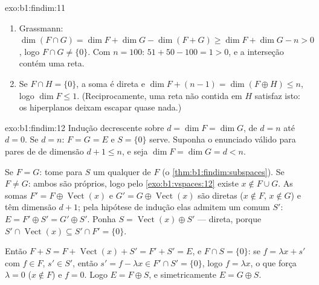 \begin{solution}{exo:b1:findim:11}
\begin{enumerate}
  \item Grassmann: $\dim(F \cap G) = \dim F + \dim G - \dim(F +
        G) \geq \dim F + \dim G - n > 0$, logo $F \cap G \neq
        \{0\}$. Com $n = 100$: $51 + 50 - 100 = 1 > 0$, e a
        interseção contém uma reta.
  \item Se $F \cap H = \{0\}$, a soma é direta e $\dim F +
        (n - 1) = \dim(F \oplus H) \leq n$, logo $\dim F \leq 1$.
        (Reciprocamente, uma reta não contida em $H$ satisfaz
        isto: os hiperplanos deixam escapar quase nada.)
\end{enumerate}
\end{solution}

\begin{solution}{exo:b1:findim:12}
Indução decrescente sobre $d = \dim F = \dim G$, de $d = n$ até $d = 0$. Se
$d = n$: $F = G = E$ e $S = \{0\}$ serve. Suponha o enunciado válido para
pares de  de dimensão $d + 1 \leq n$, e seja $\dim F = \dim G = d < n$.

Se $F = G$: tome para $S$ um  qualquer de $F$
(o \cref{thm:b1:findim:subspaces}). Se $F \neq G$: ambos são próprios, logo pelo \cref{exo:b1:vspaces:12} existe
$x \notin F \cup G$. As somas $F' = F \oplus \operatorname{Vect}(x)$ e $G' = G \oplus
\operatorname{Vect}(x)$ são diretas ($x \notin F$, $x \notin G$) e têm
dimensão $d + 1$; pela hipótese de indução elas admitem um
 comum $S'$: $E = F' \oplus S' = G' \oplus
S'$. Ponha $S = \operatorname{Vect}(x) \oplus S'$ --- direta, porque
$S' \cap \operatorname{Vect}(x) \subseteq S' \cap F' =
\{0\}$.

Então $F + S = F + \operatorname{Vect}(x) + S' = F' + S' = E$, e $F \cap S = \{0\}$: se $f = \lambda x + s'$ com $f \in F$, $s'
\in S'$, então $s' = f - \lambda x \in F' \cap S' = \{0\}$,
logo $f
= \lambda x$, o que força $\lambda = 0$ ($x \notin F$) e $f = 0$. Logo $E = F \oplus S$, e
simetricamente $E = G \oplus S$.
\end{solution}


